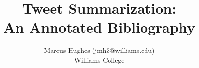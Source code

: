\documentclass [11pt]{article}
\title{Tweet Summarization: \\\medskip An Annotated Bibliography}
\author{Marcus Hughes (jmh3@williams.edu)\\ Williams College}
\begin{document}
\maketitle
\nocite{*}


\end{document}
